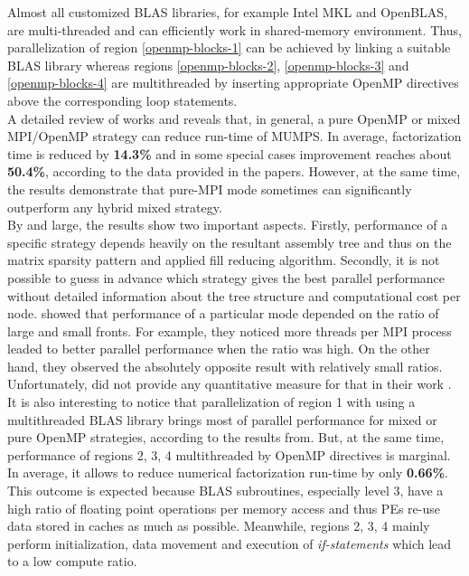 Almost all customized BLAS libraries, for example Intel MKL and OpenBLAS, are multi-threaded and can efficiently work in shared-memory environment. Thus, parallelization of region \ref{openmp-blocks-1} can be achieved by linking a suitable BLAS library whereas regions \ref{openmp-blocks-2}, \ref{openmp-blocks-3} and \ref{openmp-blocks-4} are multithreaded by inserting appropriate OpenMP directives above the corresponding loop statements.\\


A detailed review of works \cite{l2013introduction} and \cite{chowdhury2010some} reveals that, in general, a pure OpenMP or mixed MPI/OpenMP strategy can reduce run-time of MUMPS. In average, factorization time is reduced by \textbf{14.3\%} and in some special cases improvement reaches about \textbf{50.4\%}, according to the data provided in the papers. However, at the same time, the results demonstrate that pure-MPI mode sometimes can significantly outperform any hybrid mixed strategy.\\


By and large, the results show two important aspects. Firstly, performance of a specific strategy depends heavily on the resultant assembly tree and thus on the matrix sparsity pattern and applied fill reducing algorithm. Secondly, it is not possible to guess in advance which strategy gives the best parallel performance without detailed information about the tree structure and computational cost per node. \citeauthor{l2013introduction} showed that performance of a particular mode depended on the ratio of large and small fronts. For example, they noticed more threads per MPI process leaded to better parallel performance when the ratio was high. On the other hand, they observed the absolutely opposite result with relatively small ratios. Unfortunately, \citeauthor{l2013introduction} did not provide any quantitative measure for that in their work \cite{l2013introduction}.\\ 


It is also interesting to notice that parallelization of region 1 with using a multithreaded BLAS library brings most of parallel performance for mixed or pure OpenMP strategies, according to the results from\cite{l2013introduction}. But, at the same time, performance of regions 2, 3, 4 multithreaded by OpenMP directives is marginal. In average, it allows to reduce numerical factorization run-time by only \textbf{0.66\%}.\\


This outcome is expected because BLAS subroutines, especially level 3, have a high ratio of floating point operations per memory access and thus PEs re-use data stored in caches as much as possible. Meanwhile, regions 2, 3, 4 mainly perform initialization, data movement and execution of \textit{if-statements} which lead to a low compute ratio.\\


